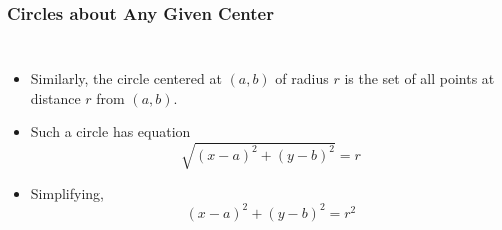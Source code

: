 \documentclass[serif,ignorenonframetext]{beamer}
\begin{document}
\begin{frame}
  \frametitle{Circles about Any Given Center}
  \begin{columns}
  \begin{itemize}[<+->]
  \item Similarly, the circle centered at $(a,b)$ of radius $r$ 
    is the set of all points at distance $r$ from $(a,b)$.
  \item Such a circle has equation
    \begin{equation*}
      \sqrt{(x-a)^2+(y-b)^2} = r
    \end{equation*}
  \item Simplifying,
    \begin{equation*}
      (x-a)^2+(y-b)^2 = r^2
    \end{equation*}
  \end{itemize}
  \end{columns}
\end{frame}
\end{document}

